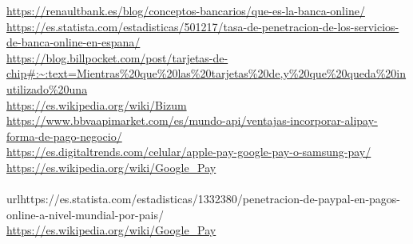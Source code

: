 

\url{https://renaultbank.es/blog/conceptos-bancarios/que-es-la-banca-online/}
\\
\url{https://es.statista.com/estadisticas/501217/tasa-de-penetracion-de-los-servicios-de-banca-online-en-espana/}
\\
\url{https://blog.billpocket.com/post/tarjetas-de-chip#:~:text=Mientras%20que%20las%20tarjetas%20de,y%20que%20queda%20inutilizado%20una}
\\
\url{https://es.wikipedia.org/wiki/Bizum}
\\
\url{https://www.bbvaapimarket.com/es/mundo-api/ventajas-incorporar-alipay-forma-de-pago-negocio/}
\\
\url{https://es.digitaltrends.com/celular/apple-pay-google-pay-o-samsung-pay/}
\\
\url{https://es.wikipedia.org/wiki/Google_Pay}
\\
\\url{https://es.statista.com/estadisticas/1332380/penetracion-de-paypal-en-pagos-online-a-nivel-mundial-por-pais/}
\\
\url{https://es.wikipedia.org/wiki/Google_Pay}
